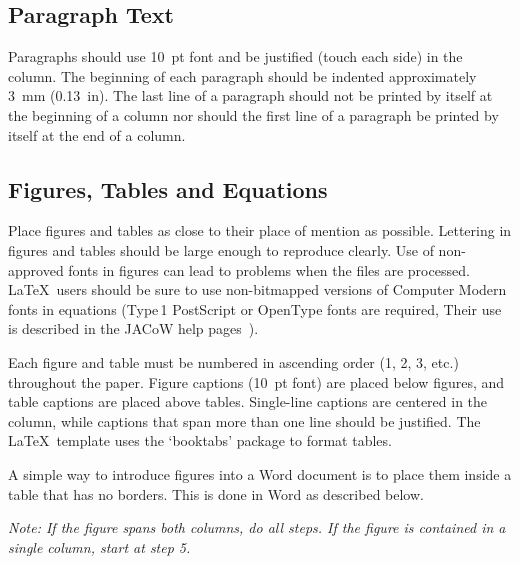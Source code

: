 \documentclass[acus,%
              ]{jacow}
\begin{document}
\subsection{Paragraph Text}

Paragraphs should use \SI{10}{pt} font and be justified (touch each side) in
the column. The beginning of each paragraph should be indented
approximately \SI{3}{mm} (\SI{0.13}{in}). The last line of a paragraph should not be
printed by itself at the beginning of a column nor should the first line of
a paragraph be printed by itself at the end of a column.

\subsection{Figures, Tables and Equations}

Place figures and tables as close to their place of mention as
possible. Lettering in figures and tables should be large enough to
reproduce clearly. Use of non-approved fonts in figures can lead to
problems when the files are processed. \LaTeX\ users should be sure to use
non-bitmapped versions of Computer Modern fonts in equations (Type\,1 PostScript
or OpenType fonts are required, Their use is described in the JACoW help
pages~\cite{jacow-help}).

Each figure and table must be numbered in ascending order (1, 2, 3, etc.) throughout
the paper. Figure captions (\SI{10}{pt} font) are placed below figures, and table captions are placed above tables. Single-line captions are centered in the column, while captions that span more than one line should be justified. The \LaTeX\ template uses the ‘booktabs’ package to
format tables.

A simple way to introduce figures into a Word document is to place them inside a table that has no borders. This is done in Word as described below.

\textit{Note: If the figure spans both columns, do all steps. If
the figure is contained in a single column, start at step 5.}
\end{document}
